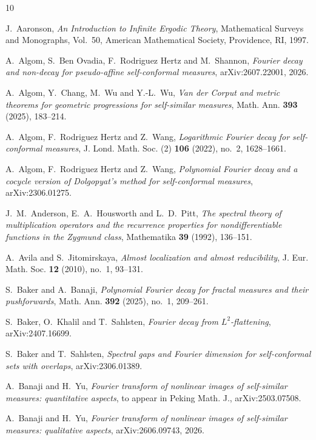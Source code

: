 \documentclass[11pt]{amsart}
\theoremstyle{plain}
\theoremstyle{definition}
\numberwithin{equation}{section}
\begin{document}
\begin{thebibliography}{10}

J.~Aaronson,
\emph{An Introduction to Infinite Ergodic Theory},
Mathematical Surveys and Monographs, Vol.~50,
American Mathematical Society, Providence, RI, 1997.

A.~Algom, S.~Ben Ovadia, F.~Rodriguez Hertz and M.~Shannon,
\emph{Fourier decay and non-decay for pseudo-affine self-conformal measures},
arXiv:2607.22001, 2026.

A.~Algom, Y.~Chang, M.~Wu and Y.-L.~Wu,
\emph{Van der Corput and metric theorems for geometric progressions for self-similar measures},
Math. Ann. \textbf{393} (2025), 183--214.

A.~Algom, F.~Rodriguez Hertz and Z.~Wang,
\emph{Logarithmic Fourier decay for self-conformal measures},
J. Lond. Math. Soc. (2) \textbf{106} (2022), no.~2, 1628--1661.

A.~Algom, F.~Rodriguez Hertz and Z.~Wang,
\emph{Polynomial Fourier decay and a cocycle version of Dolgopyat's method for self-conformal measures},
arXiv:2306.01275.

J.~M.~Anderson, E.~A.~Housworth and L.~D.~Pitt,
\emph{The spectral theory of multiplication operators and the recurrence properties for nondifferentiable functions in the Zygmund class},
Mathematika \textbf{39} (1992), 136--151.

A.~Avila and S.~Jitomirskaya,
\emph{Almost localization and almost reducibility},
J. Eur. Math. Soc. \textbf{12} (2010), no.~1, 93--131.

S.~Baker and A.~Banaji,
\emph{Polynomial Fourier decay for fractal measures and their pushforwards},
Math. Ann. \textbf{392} (2025), no.~1, 209--261.

S.~Baker, O.~Khalil and T.~Sahlsten,
\emph{Fourier decay from $L^2$-flattening},
arXiv:2407.16699.

S.~Baker and T.~Sahlsten,
\emph{Spectral gaps and Fourier dimension for self-conformal sets with overlaps},
arXiv:2306.01389.

A.~Banaji and H.~Yu,
\textit{Fourier transform of nonlinear images of self-similar measures: quantitative aspects},
to appear in Peking Math. J., arXiv:2503.07508.

A.~Banaji and H.~Yu,
\textit{Fourier transform of nonlinear images of self-similar measures: qualitative aspects},
arXiv:2606.09743, 2026.


\end{thebibliography}
\end{document}
